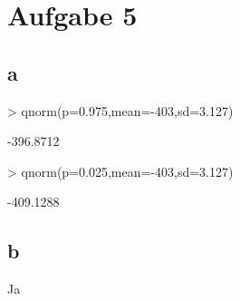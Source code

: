 

\section{Aufgabe 5}

\subsection{a}
\begin{Schunk}
\begin{Sinput}
> qnorm(p=0.975,mean=-403,sd=3.127)
\end{Sinput}
\begin{Soutput}
[1] -396.8712
\end{Soutput}
\begin{Sinput}
> qnorm(p=0.025,mean=-403,sd=3.127)
\end{Sinput}
\begin{Soutput}
[1] -409.1288
\end{Soutput}
\end{Schunk}

\subsection{b}
Ja
